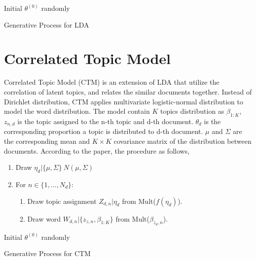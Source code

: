 \begin{algorithm}[H]
Initial $ \theta^{(0)} $ randomly\\
\caption{Generative Process for LDA}
\end{algorithm}
\section{Correlated Topic Model}
Correlated Topic Model (CTM)\cite{blei_correlated_2007} is an extension of LDA that utilize the correlation of latent topics, and relates the similar documents together. Instead of Dirichlet distribution, CTM applies multivariate logistic-normal distribution to model the word distribution. 
The model contain $ K $ topics distribution as $ \beta_{1:K} $, 
$ z_{n,d} $ is the topic assigned to the n-th topic and d-th document.
$ \theta_d $ is the corresponding proportion a topic is distributed to d-th document.
$ \mu $ and $ \Sigma $ are the corresponding mean and $ K \times K $ covariance matrix of the distribution between documents.
According to the paper\cite{blei_correlated_2007}, the procedure as follows,
\begin{enumerate}
\item Draw $\eta_d|\{\mu,\Sigma\}~N(\mu,\Sigma)$
\item For $ n \in \{1,\dots,N_d\} $:
\begin{enumerate}
\item Draw topic assignment $ Z_{d,n}|\eta_d $ from Mult($ f(\eta_d) $).
\item Draw word $ W_{d,n}|\{z_{z,n},\beta_{1:K}\} $ from Mult($ \beta_{z_d,n} $).
\end{enumerate}
\end{enumerate}
\begin{algorithm}[H]
Initial $ \theta^{(0)} $ randomly\\
\caption{Generative Process for CTM}
\end{algorithm}
